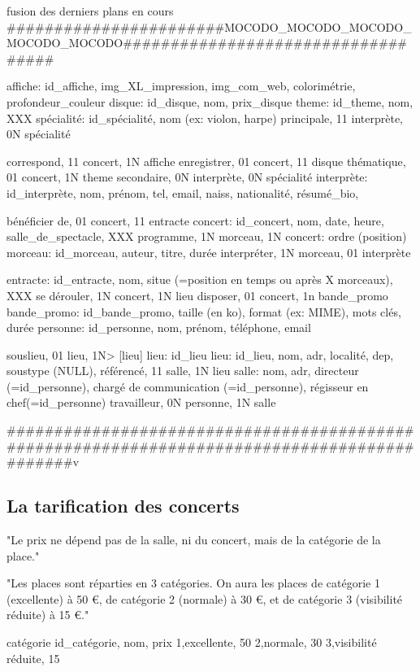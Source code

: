 \documentclass[12pt,a4paper]{article}
\begin{document}
{fusion des derniers plans en cours
#######################MOCODO_MOCODO_MOCODO_MOCODO_MOCODO###################################

affiche: id_affiche, img_XL_impression, img_com_web, colorimétrie, profondeur_couleur
disque: id_disque, nom, prix_disque
theme: id_theme, nom, XXX
spécialité: id_spécialité, nom (ex: violon, harpe)
principale, 11 interprète, 0N spécialité

correspond, 11 concert, 1N affiche
enregistrer, 01 concert, 11 disque
thématique, 01 concert, 1N theme
secondaire, 0N interprète, 0N spécialité
interprète: id_interprète, nom, prénom, tel, email, naiss, nationalité, résumé_bio,

bénéficier de, 01 concert, 11 entracte
concert: id_concert, nom, date, heure, salle_de_spectacle, XXX
programme, 1N morceau, 1N concert: ordre (position)
morceau: id_morceau, auteur, titre, durée
interpréter, 1N morceau, 01 interprète

entracte: id_entracte, nom, situe (=position en temps ou après X morceaux), XXX
se dérouler, 1N concert, 1N lieu
disposer, 01 concert, 1n bande_promo
bande_promo: id_bande_promo, taille (en ko), format (ex: MIME), mots clés, durée
personne: id_personne, nom, prénom, téléphone, email

souslieu, 01 lieu,   1N> [lieu] lieu: id_lieu
lieu: id_lieu, nom, adr, localité, dep, soustype (NULL),
référencé, 11 salle, 1N lieu
salle: nom, adr, directeur (=id_personne), chargé de communication (=id_personne), régisseur en chef(=id_personne)
travailleur, 0N personne, 1N salle

#############################################################################################v







\subsection{La tarification des concerts}


"Le prix ne dépend pas de la salle, ni du concert, mais de la catégorie de la place."

"Les places sont réparties en 3 catégories. On aura les places de catégorie 1 (excellente) à 50 €, de catégorie 2 (normale) à 30 €, et de catégorie 3 (visibilité réduite) à 15 €."

catégorie
id_catégorie, nom, prix
1,excellente, 50
2,normale, 30
3,visibilité réduite, 15



}
\end{document}
